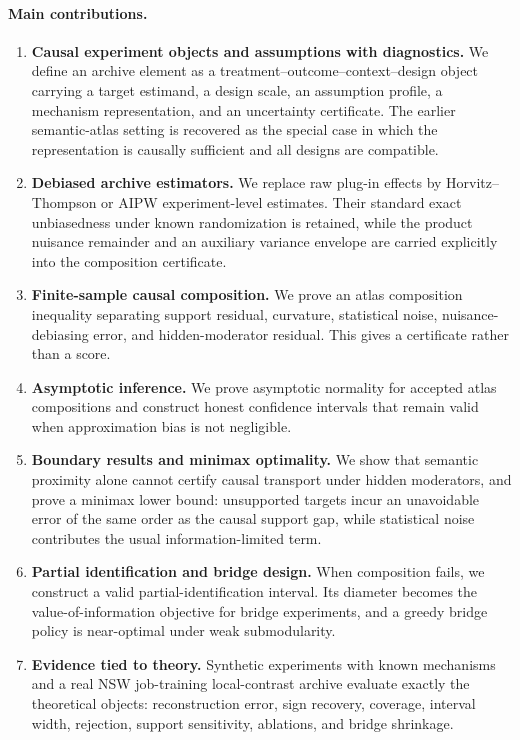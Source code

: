 \documentclass[11pt]{article}
\numberwithin{equation}{section}
\newcommand{\1}{\mathbf 1}
\begin{document}
\paragraph{Main contributions.}
\begin{enumerate}[leftmargin=2.2em]
\item \textbf{Causal experiment objects and assumptions with diagnostics.}  We define an archive element as a treatment--outcome--context--design object carrying a target estimand, a design scale, an assumption profile, a mechanism representation, and an uncertainty certificate.  The earlier semantic-atlas setting is recovered as the special case in which the representation is causally sufficient and all designs are compatible.
\item \textbf{Debiased archive estimators.}  We replace raw plug-in effects by Horvitz--Thompson or AIPW experiment-level estimates.  Their standard exact unbiasedness under known randomization is retained, while the product nuisance remainder and an auxiliary variance envelope are carried explicitly into the composition certificate.
\item \textbf{Finite-sample causal composition.}  We prove an atlas composition inequality separating support residual, curvature, statistical noise, nuisance-debiasing error, and hidden-moderator residual.  This gives a certificate rather than a score.
\item \textbf{Asymptotic inference.}  We prove asymptotic normality for accepted atlas compositions and construct honest confidence intervals that remain valid when approximation bias is not negligible.
\item \textbf{Boundary results and minimax optimality.}  We show that semantic proximity alone cannot certify causal transport under hidden moderators, and prove a minimax lower bound: unsupported targets incur an unavoidable error of the same order as the causal support gap, while statistical noise contributes the usual information-limited term.
\item \textbf{Partial identification and bridge design.}  When composition fails, we construct a valid partial-identification interval.  Its diameter becomes the value-of-information objective for bridge experiments, and a greedy bridge policy is near-optimal under weak submodularity.
\item \textbf{Evidence tied to theory.}  Synthetic experiments with known mechanisms and a real NSW job-training local-contrast archive evaluate exactly the theoretical objects: reconstruction error, sign recovery, coverage, interval width, rejection, support sensitivity, ablations, and bridge shrinkage.
\end{enumerate}
\end{document}
